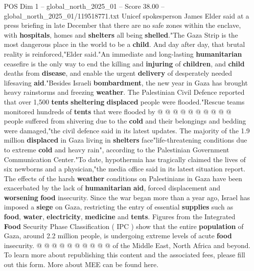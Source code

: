 \begin{textsample}{POS Dim 1 – global\_north\_2025\_01 – Score 38.00 – global\_north\_2025\_01/119518771.txt}
Unicef spokesperson James Elder said at a press briefing in late December that there are no safe zones within the enclave, with \textbf{hospitals}, homes and \textbf{shelters} all being \textbf{shelled}."The Gaza Strip is the most dangerous place in the world to be a \textbf{child}.
And day after day, that brutal reality is reinforced,"Elder said."An immediate and long-lasting \textbf{humanitarian} ceasefire is the only way to end the killing and \textbf{injuring} of \textbf{children}, and \textbf{child} deaths from \textbf{disease}, and enable the urgent \textbf{delivery} of desperately needed lifesaving \textbf{aid}."Besides Israeli \textbf{bombardment}, the new year in Gaza has brought heavy rainstorms and freezing \textbf{weather}.
The Palestinian Civil Defence reported that over 1,500 \textbf{tents} \textbf{sheltering} \textbf{displaced} people were flooded."Rescue teams monitored hundreds of \textbf{tents} that were flooded by @ @ @ @ @ @ @ @ @ @ people suffered from shivering due to the \textbf{cold} and their belongings and bedding were damaged,"the civil defence said in its latest updates.
The majority of the 1.9 million \textbf{displaced} in Gaza living in \textbf{shelters} face"life-threatening conditions due to extreme \textbf{cold} and heavy rain", according to the Palestinian Government Communication Center."To date, hypothermia has tragically claimed the lives of six newborns and a physician,"the media office said in its latest situation report.
The effects of the harsh \textbf{weather} conditions on Palestinians in Gaza have been exacerbated by the lack of \textbf{humanitarian} \textbf{aid}, forced displacement and \textbf{worsening} \textbf{food} insecurity.
Since the war began more than a year ago, Israel has imposed a \textbf{siege} on Gaza, restricting the entry of essential \textbf{supplies} such as \textbf{food}, \textbf{water}, \textbf{electricity}, \textbf{medicine} and \textbf{tents}.
Figures from the Integrated \textbf{Food} Security Phase Classification ( IPC ) show that the entire \textbf{population} of Gaza, around 2.2 million people, is undergoing extreme levels of acute \textbf{food} insecurity. @ @ @ @ @ @ @ @ @ @ of the Middle East, North Africa and beyond.
To learn more about republishing this content and the associated fees, please fill out this form.
More about MEE can be found here.

\end{textsample}
